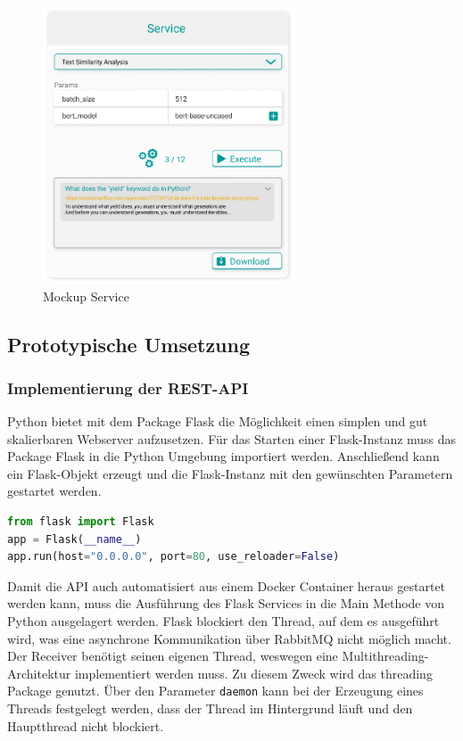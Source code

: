 \begin{figure}[H]
  \centering
    \includegraphics[width = 7.5cm]{bilder/mockupService}
    \caption{Mockup Service}
\end{figure}

\subsection{Prototypische Umsetzung}
\subsubsection{Implementierung der REST-API}
Python bietet mit dem Package Flask die Möglichkeit einen simplen und gut skalierbaren Webserver aufzusetzen. Für das Starten einer Flask-Instanz muss das Package Flask in die Python Umgebung importiert werden. Anschließend kann ein Flask-Objekt erzeugt und die Flask-Instanz mit den gewünschten Parametern gestartet werden.

\begin{lstlisting}[language=Python, caption={Aufsetzen einer Flask-Instanz}]
from flask import Flask
app = Flask(__name__)
app.run(host="0.0.0.0", port=80, use_reloader=False)
\end{lstlisting}

Damit die API auch automatisiert aus einem Docker Container heraus gestartet werden kann, muss die Ausführung des Flask Services in die Main Methode von Python ausgelagert werden. Flask blockiert den Thread, auf dem es ausgeführt wird, was eine asynchrone Kommunikation über RabbitMQ nicht möglich macht. Der Receiver benötigt seinen eigenen Thread, weswegen eine Multithreading-Architektur implementiert werden muss. Zu diesem Zweck wird das threading Package genutzt. Über den Parameter \texttt{daemon} kann bei der Erzeugung eines Threads festgelegt werden, dass der Thread im Hintergrund läuft und den Hauptthread nicht blockiert.

